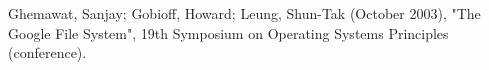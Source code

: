 \documentclass[conference]{IEEEtran}
\begin{document}

%
%
%
\begin{thebibliography}{1}


Ghemawat, Sanjay; Gobioff, Howard; Leung, Shun-Tak (October 2003), "The Google File System", 19th Symposium on Operating Systems Principles (conference).

\end{thebibliography}




\end{document}
